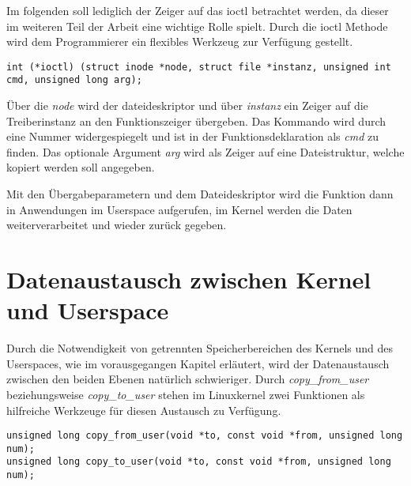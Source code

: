 Im folgenden soll lediglich der Zeiger auf das \acf{ioctl} betrachtet werden, da dieser im weiteren Teil der Arbeit eine wichtige Rolle spielt.
Durch die \ac{ioctl} Methode wird dem Programmierer ein flexibles Werkzeug zur Verfügung gestellt. 

\begin{lstfloat}
\begin{lstlisting}
int (*ioctl) (struct inode *node, struct file *instanz, unsigned int cmd, unsigned long arg);
\end{lstlisting}
\end{lstfloat}

Über die \textit{node} wird der \gls{dateideskriptor} und über \textit{instanz} ein Zeiger auf die Treiberinstanz an den Funktionszeiger übergeben. Das Kommando wird durch eine Nummer widergespiegelt und ist in der Funktionsdeklaration als \textit{cmd} zu finden. Das optionale Argument \textit{arg} wird als Zeiger auf eine Dateistruktur, welche kopiert werden soll angegeben. \citep[S. 249f.]{schroder2009embedded} %


Mit den Übergabeparametern und dem Dateideskriptor wird die Funktion dann in Anwendungen im Userspace aufgerufen, im Kernel werden die Daten weiterverarbeitet und wieder zurück gegeben.

\section{Datenaustausch zwischen Kernel und Userspace}
Durch die Notwendigkeit von getrennten Speicherbereichen des Kernels und des Userspaces, wie im vorausgegangen Kapitel erläutert, wird der Datenaustausch zwischen den beiden Ebenen natürlich schwieriger. Durch \textit{copy\_from\_user} beziehungsweise \textit{copy\_to\_user} stehen im Linuxkernel zwei Funktionen als hilfreiche Werkzeuge für diesen Austausch zu Verfügung. %


\begin{lstfloat}
\begin{lstlisting}
unsigned long copy_from_user(void *to, const void *from, unsigned long num);
unsigned long copy_to_user(void *to, const void *from, unsigned long num);
\end{lstlisting}
\end{lstfloat}

